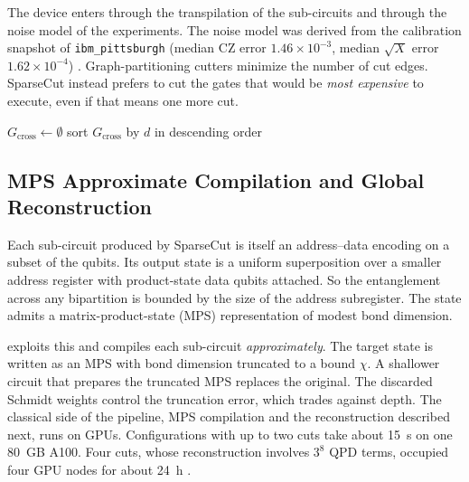 The device enters through the transpilation of the sub-circuits and through the noise model of the experiments. The noise model was derived from the calibration snapshot of \texttt{ibm\_pittsburgh} (median CZ error $1.46\times10^{-3}$, median $\sqrt{X}$ error $1.62\times10^{-4}$) \cite{guo2025shardq}. Graph-partitioning cutters minimize the number of cut edges. SparseCut instead prefers to cut the gates that would be \emph{most expensive} to execute, even if that means one more cut.

\begin{algorithm}[htbp]
\caption{SparseCut: deterministic cut selection for address--data encoders (after Alg.~1 of \cite{guo2025shardq}).}\label{alg:qml:sparsecut}
$G_{\mathrm{cross}} \leftarrow \emptyset$\;
sort $G_{\mathrm{cross}}$ by $d$ in descending order 
\end{algorithm}

\subsection{MPS Approximate Compilation and Global Reconstruction}\label{sec:qml:shardq:mps}

Each sub-circuit produced by SparseCut is itself an address--data encoding on a subset of the qubits. Its output state is a uniform superposition over a smaller address register with product-state data qubits attached. So the entanglement across any bipartition is bounded by the size of the address subregister. The state admits a matrix-product-state (MPS) representation \cite{vidal2003mps,perezgarcia2006mps} of modest bond dimension.

\shardq{} exploits this and compiles each sub-circuit \emph{approximately}. The target state is written as an MPS with bond dimension truncated to a bound $\chi$. A shallower circuit that prepares the truncated MPS replaces the original. The discarded Schmidt weights control the truncation error, which trades against depth. The classical side of the pipeline, MPS compilation and the reconstruction described next, runs on GPUs. Configurations with up to two cuts take about \SI{15}{\second} on one \SI{80}{GB} A100. Four cuts, whose reconstruction involves $3^{8}$ QPD terms, occupied four GPU nodes for about \SI{24}{\hour} \cite{guo2025shardq}.

